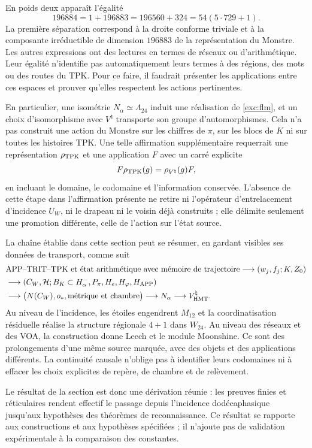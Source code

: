 En poids deux apparaît l'égalité
\[
 196884=1+196883=196560+324=54(5\cdot729+1).
\]
La première séparation correspond à la droite conforme triviale et à la
composante irréductible de dimension $196883$ de la représentation
du Monstre. Les autres expressions ont des lectures en termes de réseaux ou
d'arithmétique. Leur égalité n'identifie pas automatiquement leurs termes
à des régions, des mots ou des routes du TPK. Pour ce faire, il faudrait
présenter les applications entre ces espaces et prouver qu'elles respectent les
actions pertinentes.

En particulier, une isométrie $N_\alpha\simeq\Lambda_{24}$ induit
une réalisation de \eqref{exc:flm}, et un choix d'isomorphisme
avec $V^\natural$ transporte son groupe d'automorphismes. Cela n'a pas
construit une action du Monstre sur les chiffres de
$\pi$, sur les blocs de $K$ ni sur toutes les histoires TPK.
Une telle affirmation supplémentaire requerrait une représentation
$\rho_{\rm TPK}$ et une application $F$ avec un carré explicite
\[
 F\rho_{\rm TPK}(g)=\rho_{V^\natural}(g)F,
\]
en incluant le domaine, le codomaine et l'information conservée. L'absence
de cette étape dans l'affirmation présente ne retire ni l'opérateur d'entrelacement
d'incidence $U_W$, ni le drapeau ni le voisin déjà construits ; elle
délimite seulement une promotion différente, celle de l'action sur l'état source.

La chaîne établie dans cette section peut se résumer, en gardant visibles ses données de transport, comme suit
\begin{align*}
 &\text{APP--TRIT--TPK et état arithmétique avec mémoire de trajectoire}
   \longrightarrow (w_j,f_j;K,Z_0)\\
 &\longrightarrow (C_W,\mathcal H;B_K\subset H^-_\alpha,
                   P_\pi,H_e,H_\varphi,H_{\rm APP})\\
 &\longrightarrow \bigl(N(C_W),o_*,\text{métrique et chambre}\bigr)
   \longrightarrow N_\alpha
   \longrightarrow V^\natural_{\rm HMT}.
\end{align*}
Au niveau de l'incidence, les étoiles engendrent $M_{12}$ et la
coordinatisation résiduelle réalise la structure régionale $4+1$ dans $W_{24}$.
Au niveau des réseaux et des VOA, la construction donne Leech et le module
Moonshine. Ce sont des prolongements d'une même source marquée, avec
des objets et des applications différents. La continuité causale n'oblige pas à
identifier leurs codomaines ni à effacer les choix explicites
de repère, de chambre et de relèvement.

Le résultat de la section est donc une dérivation réunie :
les preuves finies et réticulaires rendent effectif le passage depuis
l’incidence dodécaphasique jusqu’aux hypothèses des théorèmes de
reconnaissance. Ce résultat se rapporte aux constructions et
aux hypothèses spécifiées ; il n’ajoute pas de validation expérimentale
à la comparaison des constantes.
